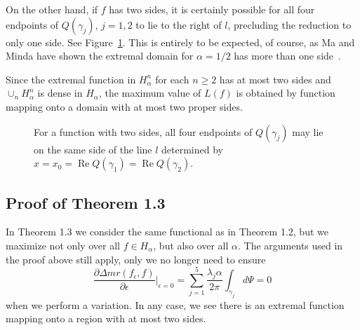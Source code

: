 \documentclass{cmft}
\newcommand{\al}{\alpha}
\DeclareMathOperator{\re}{Re}
\begin{document}
On the other hand, if $f$ has two sides, it is certainly
possible for all four endpoints of $Q(\gamma_j)$, $j=1,2$ to lie to the
right of $l$, precluding the reduction to only one side.
 See Figure~\ref{F:2-sides}. This is entirely to be expected, of course,
as Ma and Minda have shown the extremal domain for $\al=1/2$ 
has more than one side~\cite{MM94}. 

Since the extremal function in $H_\al^n$ for each $n\geq 2$
has at most two sides and $\cup_n H_\al^n$ is dense in $H_\al$, the
maximum value of $L(f)$ is obtained by function mapping onto a domain
with at most two proper sides.


\begin{figure}
\begin{center}
\caption{For a function with two sides, all four endpoints of $Q(\gamma_j)$ may
  lie on the same side of the line $l$ determined by 
$x=x_0=\re Q(\gamma_1)=\re Q(\gamma_2)$.}
\label{F:2-sides}
\end{center}
\end{figure}


\subsection{Proof of Theorem 1.3}

In Theorem 1.3 we consider the same functional as in Theorem 1.2, but
we maximize not only over all $f\in H_\al$, but also over all $\alpha$.
The arguments used in the proof above still apply, only 
we no longer need to ensure
\[
\frac{\partial\Delta mr (f_\epsilon,f)}{\partial\epsilon}\Biggr\vert_{\epsilon=0}
=  \sum_{j=1}^5 \frac{\lambda_j\al}{2\pi} \int_{\gamma_j} d\Psi=0
\]
when we perform a variation.  In any case, we see there is an extremal 
function mapping onto a region with at most two sides.
\end{document}
